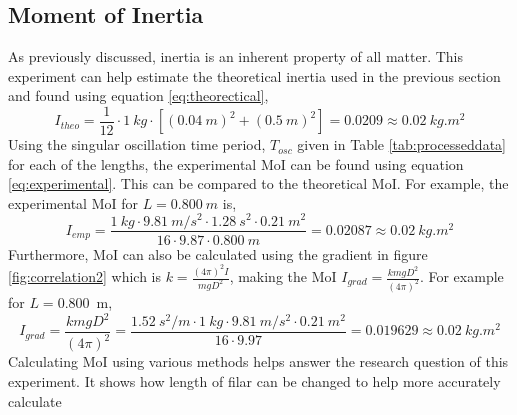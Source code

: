 \documentclass[a4paper,12pt]{article}
\theoremstyle{definition}
\begin{document}
\subsection{Moment of Inertia}
As previously discussed, inertia is an inherent property of all matter. This experiment can help estimate the theoretical inertia used in the previous section and found using equation \ref{eq:theorectical},
\begin{equation}\label{eq:moi}
	I_{theo}=\frac{1}{12}\cdot \SI{1}{kg}\cdot[(\SI{0.04}{m})^2+(\SI{0.5}{m})^2]=0.0209\approx \SI{0.02}{kg.m^2}
\end{equation}
Using the singular oscillation time period, $T_{osc}$ given in Table \ref{tab:processeddata} for each of the lengths, the experimental MoI can be found using equation \ref{eq:experimental}. This can be compared to the theoretical MoI. For example, the experimental MoI for $L=\SI{0.800}{m}$ is,
\begin{equation}
	I_{emp}=\frac{\SI{1}{kg}\cdot \SI{9.81}{m/s^2} \cdot\SI{1.28}{s^2}\cdot \SI{0.21}{m^2}}{16 \cdot 9.87 \cdot \SI{0.800}{m}} = 0.02087 \approx \SI{0.02}{kg.m^2}
\end{equation}
Furthermore, MoI can also be calculated using the gradient in figure \ref{fig:correlation2} which is $k=\frac{(4 \pi)^2 I}{mgD^2}$, making the MoI $I_{grad}=\frac{kmgD^2}{(4 \pi)^2}$. For example for $L=$\SI{0.800}{m},
\begin{equation}
	I_{grad} = \frac{kmgD^2}{(4 \pi)^2} = \frac{\SI{1.52}{s^2/m} \cdot \SI{1}{kg} \cdot \SI{9.81}{m/s^2} \cdot \SI{0.21}{m^2}}{16 \cdot 9.97} = 0.019629 \approx \SI{0.02}{kg.m^2}
\end{equation}
Calculating MoI using various methods helps answer the research question of this experiment. It shows how length of filar can be changed to help more accurately calculate 
\end{document}
